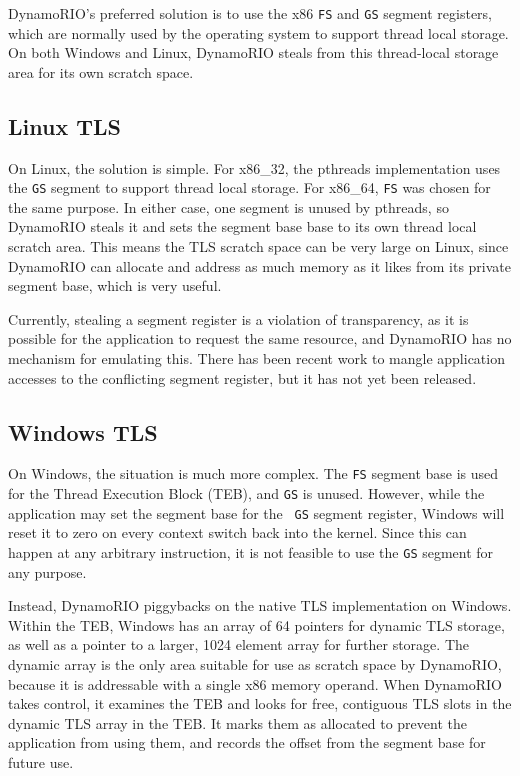 DynamoRIO's preferred solution is to use the x86 {\tt FS} and {\tt GS} segment
registers, which are normally used by the operating system to support thread
local storage.  On both Windows and Linux, DynamoRIO steals from this
thread-local storage area for its own scratch space.

\subsection{Linux TLS}

On Linux, the solution is simple.  For x86\_32, the pthreads implementation uses
the {\tt GS} segment to support thread local storage.  For x86\_64, {\tt FS} was
chosen for the same purpose.  In either case, one segment is unused by pthreads,
so DynamoRIO steals it and sets the segment base base to its own thread local
scratch area.  This means the TLS scratch space can be very large on Linux,
since DynamoRIO can allocate and address as much memory as it likes from its
private segment base, which is very useful.

Currently, stealing a segment register is a violation of transparency, as it is
possible for the application to request the same resource, and DynamoRIO has no
mechanism for emulating this.  There has been recent work to mangle application
accesses to the conflicting segment register, but it has not yet been released.

\subsection{Windows TLS}
\label{sec:windows_tls}

On Windows, the situation is much more complex.  The {\tt FS} segment base is
used for the Thread Execution Block (TEB)\cite{inside_win2k}, and {\tt GS} is
unused.  However, while the application may set the segment base for the {\tt
GS} segment register, Windows will reset it to zero on every context switch back
into the kernel.  Since this can happen at any arbitrary instruction, it is not
feasible to use the {\tt GS} segment for any purpose.

Instead, DynamoRIO piggybacks on the native TLS implementation on Windows.
Within the TEB, Windows has an array of 64 pointers for dynamic TLS storage, as
well as a pointer to a larger, 1024 element array for further storage.  The
dynamic array is the only area suitable for use as scratch space by DynamoRIO,
because it is addressable with a single x86 memory operand.  When DynamoRIO
takes control, it examines the TEB and looks for free, contiguous TLS slots in
the dynamic TLS array in the TEB.  It marks them as allocated to prevent the
application from using them, and records the offset from the segment base for
future use.


